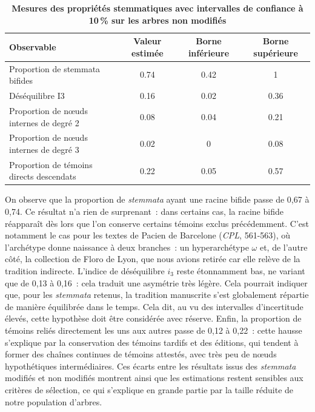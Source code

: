 \documentclass[a4paper,twoside,12pt]{book}
\begin{document}
\begin{table}[H]
	\centering
	\begin{tabular}{lccc}
		\toprule
		\textbf{Observable} & \textbf{Valeur estimée} & \textbf{Borne inférieure} & \textbf{Borne supérieure} \\
		\midrule
		Proportion de stemmata bifides              & 0.74 & 0.42 & 1    \\
		Déséquilibre I3                             & 0.16 & 0.02 & 0.36 \\
		Proportion de nœuds internes de degré 2     & 0.08 & 0.04 & 0.21 \\
		Proportion de nœuds internes de degré 3     & 0.02 & 0    & 0.08 \\
		Proportion de témoins directs descendats     & 0.22 & 0.05 & 0.57 \\
		\bottomrule
	\end{tabular}
	\caption{\textbf{Mesures des propriétés stemmatiques avec intervalles de confiance à 10\,\% sur les arbres non modifiés}}
	\label{tab:observables}
\end{table}

On observe que la proportion de \textit{stemmata} ayant une racine bifide passe de 0{,}67 à 0{,}74. Ce résultat n’a rien de surprenant~: dans certains cas, la racine bifide réapparaît dès lors que l’on conserve certains témoins exclus précédemment. C’est notamment le cas pour les textes de Pacien de Barcelone (\textit{CPL}, 561-563), où l’archétype donne naissance à deux branches~: un hyperarchétype $\omega$ et, de l’autre côté, la collection de Floro de Lyon, que nous avions retirée car elle relève de la tradition indirecte. L’indice de déséquilibre $i_3$ reste étonnamment bas, ne variant que de 0{,}13 à 0{,}16~: cela traduit une asymétrie très légère. Cela pourrait indiquer que, pour les \textit{stemmata} retenus, la tradition manuscrite s’est globalement répartie de manière équilibrée dans le temps. Cela dit, au vu des intervalles d’incertitude élevés, cette hypothèse doit être considérée avec réserve. Enfin, la proportion de témoins reliés directement les uns aux autres passe de 0{,}12 à 0{,}22~: cette hausse s’explique par la conservation des témoins tardifs et des éditions, qui tendent à former des chaînes continues de témoins attestés, avec très peu de nœuds hypothétiques intermédiaires. Ces écarts entre les résultats issus des \textit{stemmata} modifiés et non modifiés montrent ainsi que les estimations restent sensibles aux critères de sélection, ce qui s’explique en grande partie par la taille réduite de notre population d’arbres.
\end{document}
